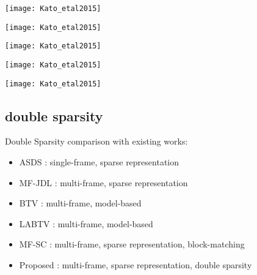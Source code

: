 \documentclass[fleqn,aspectratio=1610]{beamer}
\begin{document}
\begin{frame}[label={sec:org63a85f3}]{}
\begin{center}
\texttt{[image: Kato\_etal2015]}
\end{center}
\end{frame}

\begin{frame}[label={sec:org553f066}]{}
\begin{center}
\texttt{[image: Kato\_etal2015]}
\end{center}
\end{frame}

\begin{frame}[label={sec:org19a3de4}]{}
\begin{center}
\texttt{[image: Kato\_etal2015]}
\end{center}
\end{frame}

\begin{frame}[label={sec:orgc00745b}]{}
\begin{center}
\texttt{[image: Kato\_etal2015]}
\end{center}
\end{frame}

\begin{frame}[label={sec:orgff7758d}]{}
\begin{center}
\texttt{[image: Kato\_etal2015]}
\end{center}
\end{frame}

\subsection{double sparsity}
\label{sec:orgd36acb7}
\begin{frame}[label={sec:org5234195}]{Double Sparsity}
comparison with existing works:
\begin{itemize}
\item ASDS \parencite{Dong_etal2011}:
single-frame, sparse representation
\item MF-JDL \parencite{Wang_etal2011}:
multi-frame, sparse representation
\item BTV \parencite{Farsiu_etal2004}:
multi-frame, model-based
\item LABTV \parencite{Li_etal2010}:
multi-frame, model-based
\item MF-SC \parencite{KatoHinoMurata2015}:
multi-frame, sparse representation, block-matching
\item Proposed \parencite{KatoHinoMurata2017}:
multi-frame, sparse representation, double sparsity
\end{itemize}
\end{frame}
\end{document}
